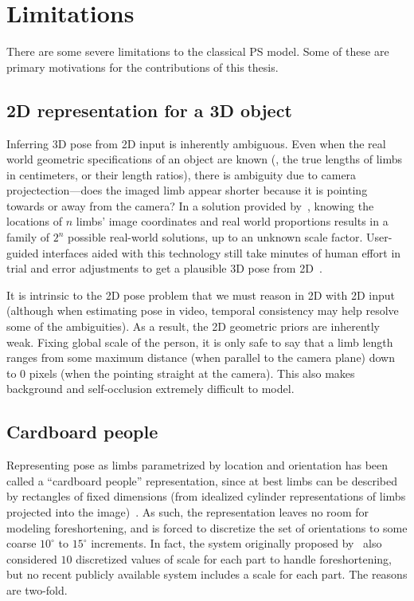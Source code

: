 \section{Limitations}
\label{sec:limitations}

There are some severe limitations to the classical PS model.  Some of these are 
primary motivations for the contributions of this thesis.  

\subsection{2D representation for a 3D object} Inferring 3D pose from 2D input 
is inherently ambiguous.  Even when the real world geometric specifications of 
an object are known (\eg, the true lengths of limbs in centimeters, or their 
length ratios), there is ambiguity due to camera projectection---does the 
imaged limb appear shorter because it is pointing towards or away from the 
camera?  In a solution provided by~\citet{cj-skel}, knowing the locations of 
$n$ limbs' image coordinates and real world proportions results in a family of 
$2^n$ possible real-world solutions, up to an unknown scale factor.  
User-guided interfaces aided with this technology still take minutes of human 
effort in trial and error adjustments to get a plausible 3D pose from 
2D~\citep{poselets}. 

It is intrinsic to the 2D pose problem that we must reason in 2D with 2D input 
(although when estimating pose in video, temporal consistency may help resolve 
some of the ambiguities).  As a result, the 2D geometric priors are inherently 
weak.  Fixing global scale of the person, it is only safe to say that a limb 
length ranges from some maximum distance (when parallel to the camera plane) 
down to 0 pixels (when the pointing straight at the camera).  This also makes 
background and self-occlusion extremely difficult to model.

\subsection{Cardboard people}
Representing pose  as limbs parametrized by location and orientation has been 
called a ``cardboard people'' representation, since at best limbs can be 
described by rectangles of fixed dimensions (from idealized cylinder 
representations of limbs projected into the image)~\citep{cardboard}.  As such, 
the representation leaves no room for modeling foreshortening, and is forced to 
discretize the set of orientations to some coarse $10^\circ$ to $15^\circ$ 
increments.  In fact, the system originally proposed by~\citet{felz05} also 
considered $10$ discretized values of scale for each part to handle 
foreshortening, but no recent publicly available system 
\citep{andriluka09,eichner09,sapp2010,sapp2010cascades,sapp2011} includes a 
scale for each part. The reasons are two-fold. 

